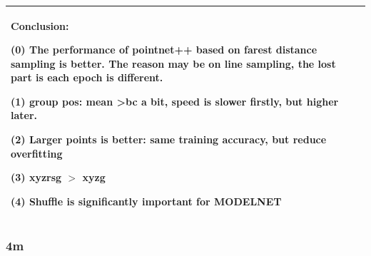 \documentclass[,table,dvipsnames]{article}
\begin{document}
\begin{tabular}{|p{1.5cm}|p{1.5cm}|p{1cm}|p{1.5cm}|p{1.5cm}|p{1.5cm}|p{5cm}| }
	\multicolumn{7}{|p{16cm}|}{ Conclusion:\par	
		(0) The performance of pointnet++ based on farest distance sampling is better. The reason may be on line sampling, the lost part is each epoch is different.\par 
		(1) group pos: mean \textgreater bc a bit, speed is slower firstly, but higher later.\par
		(2) Larger points is better: same training accuracy, but reduce overfitting\par 
		(3) xyzrsg $>$ xyzg\par 
		(4) Shuffle is significantly important for MODELNET } \\
	\hline	
\end{tabular}

\subsubsection{4m}
\end{document}
